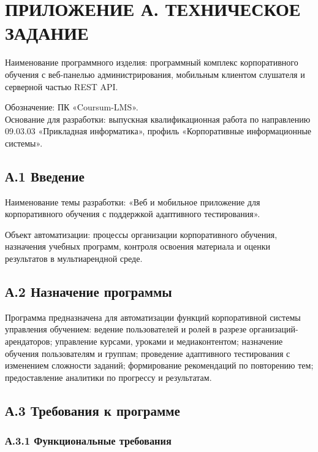\chapter{{\fontsize{14pt}{21pt}\selectfont\MakeUppercase{Приложение А. Техническое задание}}}
\label{app:tz}

\noindent{}Наименование программного изделия: программный комплекс корпоративного обучения с веб-панелью администрирования, мобильным клиентом слушателя и серверной частью REST API.

\noindent{}Обозначение: ПК «Coursum-LMS».\\
\noindent{}Основание для разработки: выпускная квалификационная работа по направлению 09.03.03 «Прикладная информатика», профиль «Корпоративные информационные системы».

\section*{А.1 Введение}

Наименование темы разработки: «Веб и мобильное приложение для корпоративного обучения с поддержкой адаптивного тестирования».

Объект автоматизации: процессы организации корпоративного обучения, назначения учебных программ, контроля освоения материала и оценки результатов в мультиарендной среде\cite{gost1920178,gost1930179,gost3460190}.

\section*{А.2 Назначение программы}

Программа предназначена для автоматизации функций корпоративной системы управления обучением: ведение пользователей и ролей в разрезе организаций-арендаторов; управление курсами, уроками и медиаконтентом; назначение обучения пользователям и группам; проведение адаптивного тестирования с изменением сложности заданий; формирование рекомендаций по повторению тем; предоставление аналитики по прогрессу и результатам.

\section*{А.3 Требования к программе}

\subsection*{А.3.1 Функциональные требования}

